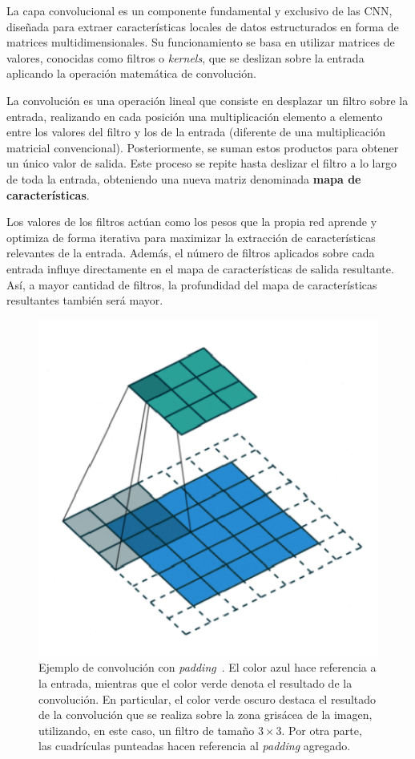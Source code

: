 La capa convolucional es un componente fundamental y exclusivo de las CNN, diseñada para extraer características locales de datos estructurados en forma de matrices multidimensionales. Su funcionamiento se basa en utilizar matrices de valores, conocidas como filtros o \emph{kernels}, que se deslizan sobre la entrada aplicando la operación matemática de convolución.

La convolución es una operación lineal que consiste en desplazar un filtro sobre la entrada, realizando en cada posición una multiplicación elemento a elemento entre los valores del filtro y los de la entrada (diferente de una multiplicación matricial convencional). Posteriormente, se suman estos productos para obtener un único valor de salida. Este proceso se repite hasta deslizar el filtro a lo largo de toda la entrada, obteniendo una nueva matriz denominada \textbf{mapa de características}.

Los valores de los filtros actúan como los pesos que la propia red aprende y optimiza de forma iterativa para maximizar la extracción de características relevantes de la entrada. Además, el número de filtros aplicados sobre cada entrada influye directamente en el mapa de características de salida resultante. Así, a mayor cantidad de filtros, la profundidad del mapa de características resultantes también será mayor.

\begin{figure}[h]
    \centering
    \includegraphics[width=0.5\linewidth]{img/convolucion.png}
    \caption[Ejemplo de convolución con \textit{padding}~\cite{Saha2018}.]{Ejemplo de convolución con \textit{padding}~\cite{Saha2018}. El color azul hace referencia a la entrada, mientras que el color verde denota el resultado de la convolución. En particular, el color verde oscuro destaca el resultado de la convolución que se realiza sobre la zona grisácea de la imagen, utilizando, en este caso, un filtro de tamaño $3 \times 3$. Por otra parte, las cuadrículas punteadas hacen referencia al \textit{padding} agregado.}\label{fig:convolucion}
\end{figure}


